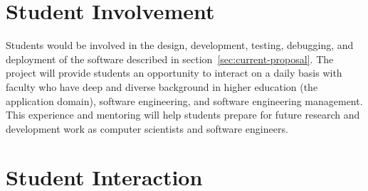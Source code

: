 \documentclass{article}
\begin{document}
\section{Student Involvement}
\label{sec:student-involvement}



Students would be involved in the design, development, testing, debugging, and deployment
of the software described in section~\ref{sec:current-proposal}.
The project will provide students an opportunity to interact
on a daily basis
with faculty who have deep and diverse background in
higher education (the application domain),
software engineering,
and software engineering management.
This experience and mentoring
will help students prepare for future
research and development work
as computer scientists and software engineers.

\section{Student Interaction}
\label{sec:student-interaction}




\end{document}
